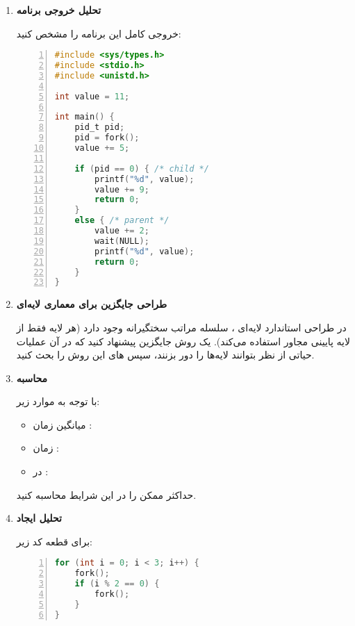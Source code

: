 \documentclass[12pt]{article}
\begin{document}
\begin{enumerate}[rightmargin=1cm,leftmargin=2cm]
\item \textbf{تحلیل خروجی برنامه }

خروجی کامل این برنامه  را مشخص کنید:
\newpage

\begin{latin}
    
\begin{lstlisting}[language=C, basicstyle=\ttfamily\footnotesize, numbers=left]
#include <sys/types.h>
#include <stdio.h>
#include <unistd.h>

int value = 11;

int main() {
    pid_t pid;
    pid = fork();
    value += 5;
    
    if (pid == 0) { /* child */
        printf("%d", value);
        value += 9;
        return 0;
    }
    else { /* parent */
        value += 2;
        wait(NULL);
        printf("%d", value);
        return 0;
    }
}
\end{lstlisting}
\end{latin}

\item \textbf{طراحی جایگزین برای معماری لایه‌ای }

در طراحی استاندارد لایه‌ای ، سلسله مراتب سختگیرانه وجود دارد (هر لایه فقط از لایه پایینی مجاور استفاده می‌کند). یک روش جایگزین پیشنهاد کنید که در آن عملیات حیاتی از نظر  بتوانند لایه‌ها را دور بزنند، سپس های این روش را بحث کنید.

\item \textbf{محاسبه }

با توجه به موارد زیر:
\begin{itemize}
    \item میانگین زمان  : 
    \item زمان : 
    \item {} در : 
\end{itemize}

حداکثر  ممکن  را در این شرایط محاسبه کنید.

\item \textbf{تحلیل ایجاد }

برای قطعه کد زیر:
\begin{latin}
\begin{lstlisting}[language=C, basicstyle=\ttfamily\footnotesize, numbers=left]
for (int i = 0; i < 3; i++) {
    fork();
    if (i % 2 == 0) {
        fork();
    }
}
\end{lstlisting}
    

\end{latin}
\end{enumerate}
\end{document}
